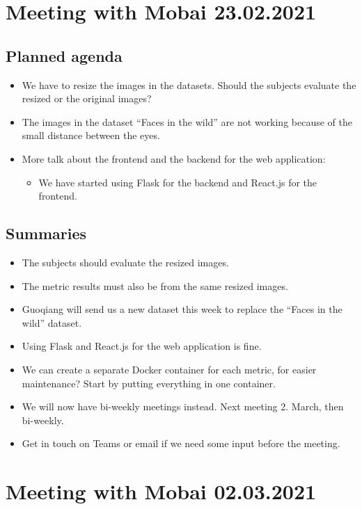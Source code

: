 \newpage

\section*{Meeting with Mobai 23.02.2021}
\subsection*{Planned agenda}
\begin{itemize}
    \item We have to resize the images in the datasets. Should the subjects evaluate the resized or the original images?
    \item The images in the dataset “Faces in the wild” are not working because of the small distance between the eyes.
    \item More talk about the frontend and the backend for the web application:
    \begin{itemize}
        \item We have started using Flask for the backend and React.js for the frontend.
    \end{itemize}
\end{itemize}

\subsection*{Summaries}
\begin{itemize}
    \item The subjects should evaluate the resized images. 
    \item The metric results must also be from the same resized images.
    \item Guoqiang will send us a new dataset this week to replace the “Faces in the wild” dataset.
    \item Using Flask and React.js for the web application is fine.
    \item We can create a separate Docker container for each metric, for easier maintenance? Start by putting everything in one container.
    \item We will now have bi-weekly meetings instead. Next meeting 2. March, then bi-weekly.
    \item Get in touch on Teams or email if we need some input before the meeting.
\end{itemize}

\newpage

\section*{Meeting with Mobai 02.03.2021}
